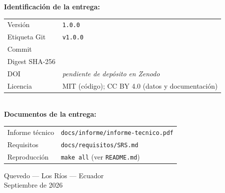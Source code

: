 \documentclass[12pt,a4paper]{article}
\begin{document}
{\bfseries Identificación de la entrega:}\\[0.18cm]
\begin{tabular}{@{}p{4.0cm}p{10.0cm}@{}}
    Versión        & \texttt{1.0.0} \\[0.12cm]
    Etiqueta Git   & \texttt{v1.0.0} \\[0.12cm]
    Commit         & \texttt{\unskip} \\[0.12cm]
    Digest SHA-256 & \texttt{\unskip} \\[0.12cm]
    DOI            & \textit{pendiente de depósito en Zenodo} \\[0.12cm]
    Licencia       & MIT (código); CC BY 4.0 (datos y documentación) \\
\end{tabular}\\[0.45cm]

{\bfseries Documentos de la entrega:}\\[0.18cm]
\begin{tabular}{@{}p{4.0cm}p{10.0cm}@{}}
    Informe técnico & \texttt{docs/informe/informe-tecnico.pdf} \\[0.12cm]
    Requisitos      & \texttt{docs/requisitos/SRS.md} \\[0.12cm]
    Reproducción    & \texttt{make all} (ver \texttt{README.md}) \\
\end{tabular}

\vfill
\begin{center}
    Quevedo --- Los Ríos --- Ecuador\\
    Septiembre de 2026
\end{center}
\end{document}
